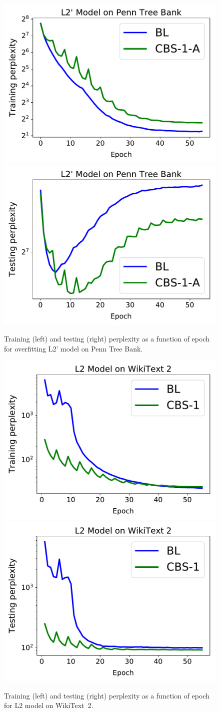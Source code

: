 \begin{figure}[htbp]
  \centering
\includegraphics[width=.45\textwidth]{fig/train_l2prime_ptb.pdf}
\includegraphics[width=.45\textwidth]{fig/test_l2prime_ptb.pdf}
  \caption{Training (left) and testing (right) perplexity as a function of epoch for overfitting L2' model on Penn Tree Bank.}
  \label{fig:l2'_ptb}
\end{figure}

\begin{figure}[!htbp]
  \centering
\includegraphics[width=.45\textwidth]{fig/train_l2_wt2.pdf}
\includegraphics[width=.45\textwidth]{fig/test_l2_wt2.pdf}
  \caption{Training (left) and testing (right) perplexity as a function of epoch for L2 model on WikiText~2.}
  \label{fig:l2_wiki}
\end{figure}
